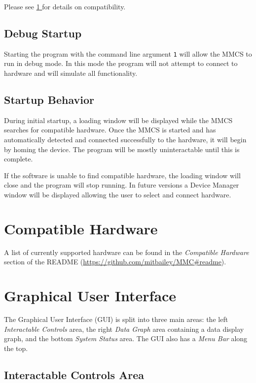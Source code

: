 \documentclass{article}
\newcommand*{\fullref}[1]{\hyperref[{#1}]{\ref*{#1} \nameref*{#1}}}
\begin{document}
Please see \fullref{section:compatiblehardware} for details on compatibility.

\subsection{Debug Startup}
Starting the program with the command line argument \verb|1| will allow the MMCS to run in debug mode. In this mode the program will not attempt to connect to hardware and will simulate all functionality.

\subsection{Startup Behavior}

During initial startup, a loading window will be displayed while the MMCS searches for compatible hardware. Once the MMCS is started and has automatically detected and connected successfully to the hardware, it will begin by homing the device. The program will be mostly uninteractable until this is complete.

If the software is unable to find compatible hardware, the loading window will close and the program will stop running. In future versions a Device Manager window will be displayed allowing the user to select and connect hardware.

\section{Compatible Hardware} \label{section:compatiblehardware}

A list of currently supported hardware can be found in the \emph{Compatible Hardware} section of the README (\url{https://github.com/mitbailey/MMC#readme}).

\section{Graphical User Interface} \label{section:interface}

The Graphical User Interface (GUI) is split into three main areas: the left \emph{Interactable Controls} area, the right \emph{Data Graph} area containing a data display graph, and the bottom \emph{System Status} area. The GUI also has a \emph{Menu Bar} along the top.

\subsection{Interactable Controls Area}
\end{document}
